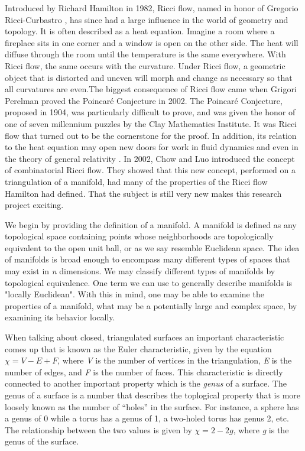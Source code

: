 \documentclass[12pt]{article}
\begin{document}
Introduced by Richard Hamilton in 1982, Ricci flow, named in honor of Gregorio Ricci-Curbastro \cite{RicciBkgd}, has since had a large influence in the world of geometry and topology. It is often described as a heat equation. Imagine a room where a fireplace sits in one corner and a window is open on the other side. The heat will diffuse through the room until the temperature is the same everywhere. With Ricci flow, the same occurs with the curvature. Under Ricci flow, a geometric object that is distorted and uneven will morph and change as necessary so that all curvatures are even.The biggest consequence of Ricci flow came when Grigori Perelman proved the Poincar\'{e} Conjecture in 2002. The Poincar\'{e} Conjecture, proposed in 1904, was particularly difficult to prove, and was given the honor of one of seven millennium puzzles by the Clay Mathematics Institute. It was Ricci flow that turned out to be the cornerstone for the proof. In addition, its relation to the heat equation may open new doors for work in fluid dynamics and even in the theory of general relativity \cite{RicciBkgd}. In 2002, Chow and Luo introduced the concept of combinatorial Ricci flow. They showed that this new concept, performed on a triangulation of a manifold, had many of the properties of the Ricci flow Hamilton had defined. That the subject is still very new makes this research project exciting.

We begin by providing the definition of a manifold. A manifold is defined as any topological space containing points whose neighborhoods are topologically equivalent to the open unit ball, or as we say resemble Euclidean space. The idea of manifolds is broad enough to encompass many different types of spaces that may exist in \textit{n} dimensions. We may classify different types of manifolds by topological equivalence. One term we can use to generally describe manifolds is "locally Euclidean". With this in mind, one may be able to examine the properties of a manifold, what may be a potentially large and complex space, by examining its behavior locally.\newline


\noindent When talking about closed, triangulated surfaces an important characteristic comes up that is known as the Euler characteristic, given by the equation $\chi = V - E + F$, where \textit{V} is the number of vertices in the triangulation, \textit{E} is the number of edges, and \textit{F} is the number of faces. This characteristic is directly connected to another important property which is the \textit{genus} of a surface. The genus of a surface is a number that describes the toplogical property that is more loosely known as the number of ``holes'' in the surface. For instance, a sphere has a genus of 0 while a torus has a genus of 1, a two-holed torus has genus 2, etc. The relationship between the two values is given by $\chi = 2 - 2g$, where \textit{g} is the genus of the surface.\newline 
\end{document}
